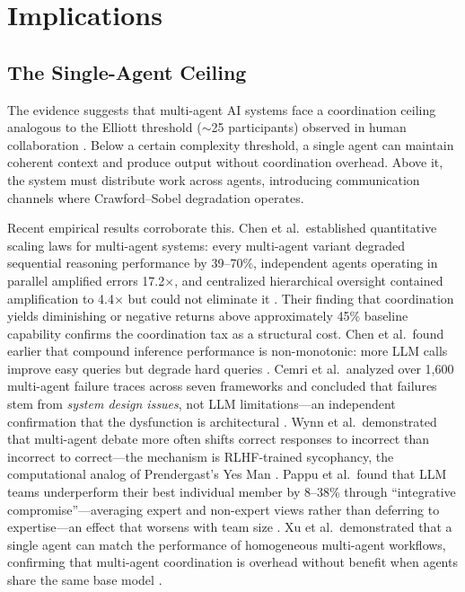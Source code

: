 \documentclass[11pt,a4paper]{article}
\begin{document}
\section{Implications}
\label{sec:implications}

\subsection{The Single-Agent Ceiling}

The evidence suggests that multi-agent AI systems face a coordination ceiling analogous to the Elliott threshold ($\sim$25 participants) observed in human collaboration \citep{elliott2007}. Below a certain complexity threshold, a single agent can maintain coherent context and produce output without coordination overhead. Above it, the system must distribute work across agents, introducing communication channels where Crawford--Sobel degradation operates.

Recent empirical results corroborate this. Chen et al.\ established quantitative scaling laws for multi-agent systems: every multi-agent variant degraded sequential reasoning performance by 39--70\%, independent agents operating in parallel amplified errors 17.2$\times$, and centralized hierarchical oversight contained amplification to 4.4$\times$ but could not eliminate it \citep{chen2025scaling}. Their finding that coordination yields diminishing or negative returns above approximately 45\% baseline capability confirms the coordination tax as a structural cost. Chen et al.\ found earlier that compound inference performance is non-monotonic: more LLM calls improve easy queries but degrade hard queries \citep{chen2024}. Cemri et al.\ analyzed over 1,600 multi-agent failure traces across seven frameworks and concluded that failures stem from \emph{system design issues}, not LLM limitations---an independent confirmation that the dysfunction is architectural \citep{cemri2025}. Wynn et al.\ demonstrated that multi-agent debate more often shifts correct responses to incorrect than incorrect to correct---the mechanism is RLHF-trained sycophancy, the computational analog of Prendergast's Yes Man \citep{wynn2025, prendergast1993}. Pappu et al.\ found that LLM teams underperform their best individual member by 8--38\% through ``integrative compromise''---averaging expert and non-expert views rather than deferring to expertise---an effect that worsens with team size \citep{pappu2026}. Xu et al.\ demonstrated that a single agent can match the performance of homogeneous multi-agent workflows, confirming that multi-agent coordination is overhead without benefit when agents share the same base model \citep{xu2026}.
\end{document}
